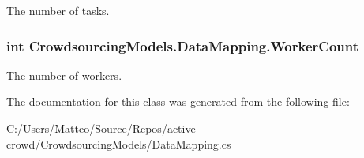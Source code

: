 The number of tasks. 

\hypertarget{class_crowdsourcing_models_1_1_data_mapping_a9e7c646eda7ddcc56b2c8e9f582299cd}{}
\subsubsection[{Worker\+Count}]{\setlength{\rightskip}{0pt plus 5cm}int Crowdsourcing\+Models.\+Data\+Mapping.\+Worker\+Count\hspace{0.3cm}{\ttfamily [get]}}\label{class_crowdsourcing_models_1_1_data_mapping_a9e7c646eda7ddcc56b2c8e9f582299cd}


The number of workers. 



The documentation for this class was generated from the following file\+:\begin{DoxyCompactItemize}
\item 
C\+:/\+Users/\+Matteo/\+Source/\+Repos/active-\/crowd/\+Crowdsourcing\+Models/Data\+Mapping.\+cs\end{DoxyCompactItemize}
